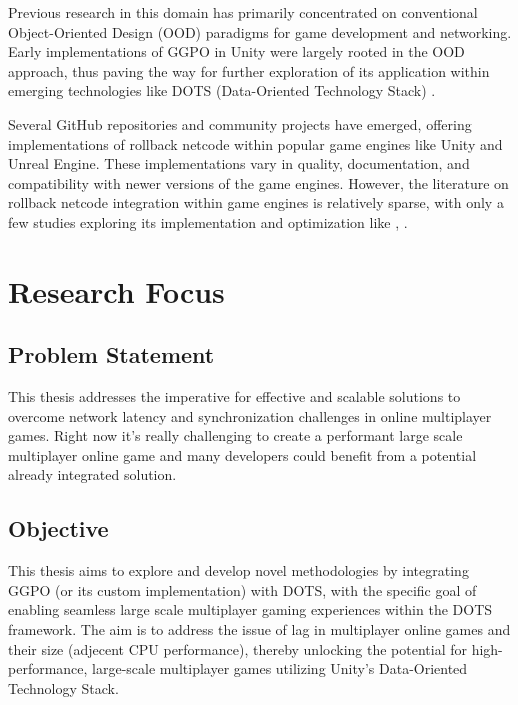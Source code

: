 Previous research in this domain has primarily concentrated on conventional Object-Oriented Design (OOD) paradigms for game development and networking. Early implementations of GGPO in Unity were largely rooted in the OOD approach, thus paving the way for further exploration of its application within emerging technologies like DOTS (Data-Oriented Technology Stack) \cite{UnityGGPO}.

Several GitHub repositories and community projects have emerged, offering implementations of rollback netcode within popular game engines like Unity and Unreal Engine. These implementations vary in quality, documentation, and compatibility with newer versions of the game engines. However, the literature on rollback netcode integration within game engines is relatively sparse, with only a few studies exploring its implementation and optimization like \cite{ECS_unity_implementation}, \cite{Lockstep_Unity}.

\section{Research Focus}

\subsection{Problem Statement}

This thesis addresses the imperative for effective and scalable solutions to overcome network latency and synchronization challenges in online multiplayer games. Right now it's really challenging to create a performant large scale multiplayer online game and many developers could benefit from a potential already integrated solution.

\subsection{Objective}

This thesis aims to explore and develop novel methodologies by integrating GGPO (or its custom implementation) with DOTS, with the specific goal of enabling seamless large scale multiplayer gaming experiences within the DOTS framework. The aim is to address the issue of lag in multiplayer online games and their size (adjecent CPU performance), thereby unlocking the potential for high-performance, large-scale multiplayer games utilizing Unity's Data-Oriented Technology Stack.

